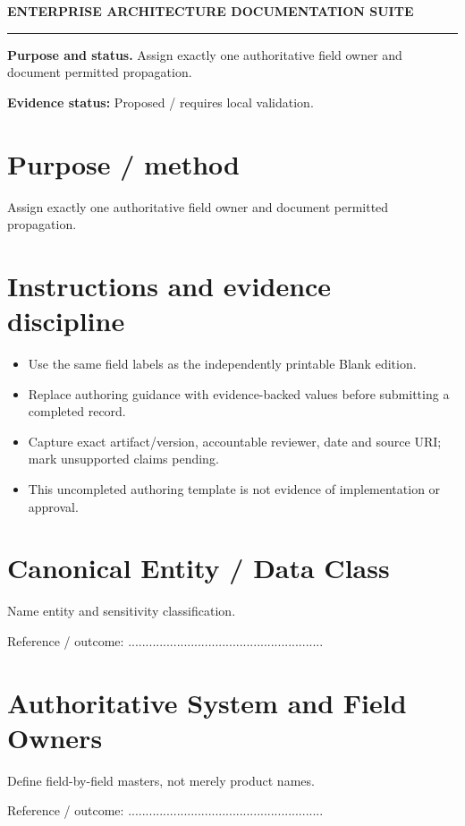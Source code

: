\documentclass[10pt,letterpaper]{article}
\begin{document}
\begin{center}
{\large\bfseries\color{teal} ENTERPRISE ARCHITECTURE DOCUMENTATION SUITE}\par
{}\par
{}\par
\end{center}
\vspace{8pt}\hrule\vspace{12pt}
\textbf{Purpose and status.} Assign exactly one authoritative field owner and document permitted propagation.\par
\textbf{Evidence status:} Proposed / requires local validation.\par
\section{Purpose / method}
Assign exactly one authoritative field owner and document permitted propagation.\par
\section{Instructions and evidence discipline}
\begin{itemize}
\item Use the same field labels as the independently printable Blank edition.
\item Replace authoring guidance with evidence-backed values before submitting a completed record.
\item Capture exact artifact/version, accountable reviewer, date and source URI; mark unsupported claims pending.
\item This uncompleted authoring template is not evidence of implementation or approval.
\end{itemize}
\section{Canonical Entity / Data Class}
Name entity and sensitivity classification.\par
Reference / outcome: ........................................................\par
\section{Authoritative System and Field Owners}
Define field-by-field masters, not merely product names.\par
Reference / outcome: ........................................................\par
\end{document}
